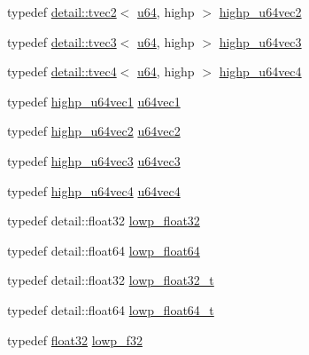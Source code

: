\begin{DoxyCompactItemize}
typedef \hyperlink{structglm_1_1detail_1_1tvec2}{detail\-::tvec2}$<$ \hyperlink{group__gtc__type__precision_ga71cedd4972f9cb1a5e14dfe5ab83ecd7}{u64}, highp $>$ \hyperlink{group__gtc__type__precision_gad11667a4764867732a89791ec2a01aeb}{highp\-\_\-u64vec2}
\item 
typedef \hyperlink{structglm_1_1detail_1_1tvec3}{detail\-::tvec3}$<$ \hyperlink{group__gtc__type__precision_ga71cedd4972f9cb1a5e14dfe5ab83ecd7}{u64}, highp $>$ \hyperlink{group__gtc__type__precision_ga3cb5c038f8cba0dfb894af66b7b2ba13}{highp\-\_\-u64vec3}
\item 
typedef \hyperlink{structglm_1_1detail_1_1tvec4}{detail\-::tvec4}$<$ \hyperlink{group__gtc__type__precision_ga71cedd4972f9cb1a5e14dfe5ab83ecd7}{u64}, highp $>$ \hyperlink{group__gtc__type__precision_ga8aa6fc9f16dfa3078d411f6361188a45}{highp\-\_\-u64vec4}
\item 
typedef \hyperlink{group__gtc__type__precision_gab48ca217e1d1cc9aac3d9f037493ae7e}{highp\-\_\-u64vec1} \hyperlink{group__gtc__type__precision_ga7d5145019ad749f4becd39ce8e786a5f}{u64vec1}
\item 
typedef \hyperlink{group__gtc__type__precision_gad11667a4764867732a89791ec2a01aeb}{highp\-\_\-u64vec2} \hyperlink{group__gtc__type__precision_gaffa78d655fd98b33e47043e2bd38641b}{u64vec2}
\item 
typedef \hyperlink{group__gtc__type__precision_ga3cb5c038f8cba0dfb894af66b7b2ba13}{highp\-\_\-u64vec3} \hyperlink{group__gtc__type__precision_gae934e74663d832989066cc852560866d}{u64vec3}
\item 
typedef \hyperlink{group__gtc__type__precision_ga8aa6fc9f16dfa3078d411f6361188a45}{highp\-\_\-u64vec4} \hyperlink{group__gtc__type__precision_ga59d78a1ff6d275bbb425dce92f607b9c}{u64vec4}
\item 
typedef detail\-::float32 \hyperlink{group__gtc__type__precision_ga92be8087f3c84504f3a44af1a9efc51e}{lowp\-\_\-float32}
\item 
typedef detail\-::float64 \hyperlink{group__gtc__type__precision_ga32e02689f4e83fb269c9047418536f2c}{lowp\-\_\-float64}
\item 
typedef detail\-::float32 \hyperlink{group__gtc__type__precision_gadfb453b23cb820e3e4e766e047c67dab}{lowp\-\_\-float32\-\_\-t}
\item 
typedef detail\-::float64 \hyperlink{group__gtc__type__precision_gac9d64f4e69d6c2eade41a848077866b5}{lowp\-\_\-float64\-\_\-t}
\item 
typedef \hyperlink{group__gtc__type__precision_ga814f2f65354b6588b067cc5c67a6b340}{float32} \hyperlink{group__gtc__type__precision_ga1b9734de4b4429dc26b1454a2a399b05}{lowp\-\_\-f32}

\end{DoxyCompactItemize}

